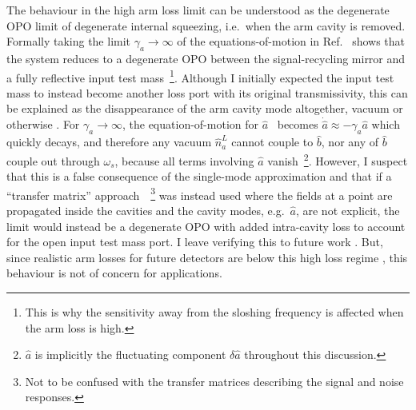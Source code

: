 The behaviour in the high arm loss limit can be understood as the degenerate OPO limit of degenerate internal squeezing, i.e.\ when the arm cavity is removed. Formally taking the limit $\gamma_a\rightarrow\infty$ of the equations-of-motion in Ref.~\cite{korobkoQuantumExpanderGravitationalwave2019} shows that the system reduces to a degenerate OPO between the signal-recycling mirror and a fully reflective input test mass~\footnote{This is why the sensitivity away from the sloshing frequency is affected when the arm loss is high.}.  Although I initially expected the input test mass to instead become another loss port with its original transmissivity, this can be explained as the disappearance of the arm cavity mode altogether, vacuum or otherwise . For $\gamma_a\rightarrow\infty$, the equation-of-motion for $\hat a$~\cite{korobkoQuantumExpanderGravitationalwave2019} becomes $\dot{\hat a}\approx -\gamma_a \hat a$ which quickly decays, and therefore any vacuum $\hat n^L_a$ cannot couple to $\hat b$, nor any of $\hat b$ couple out through $\omega_s$, because all terms involving $\hat a$ vanish~\footnote{$\hat a$ is implicitly the fluctuating component $\delta \hat a$ throughout this discussion.}.
However, I suspect that this is a false consequence of the single-mode approximation and that if a ``transfer matrix'' approach~\cite{finesse,}~\footnote{Not to be confused with the transfer matrices describing the signal and noise responses.} was instead used where the fields at a point are propagated inside the cavities and the cavity modes, e.g.\ $\hat a$, are not explicit, the limit would instead be a degenerate OPO with added intra-cavity loss to account for the open input test mass port. I leave verifying this to future work .
But, since realistic arm losses for future detectors are below this high loss regime , this behaviour is not of concern for applications. 

